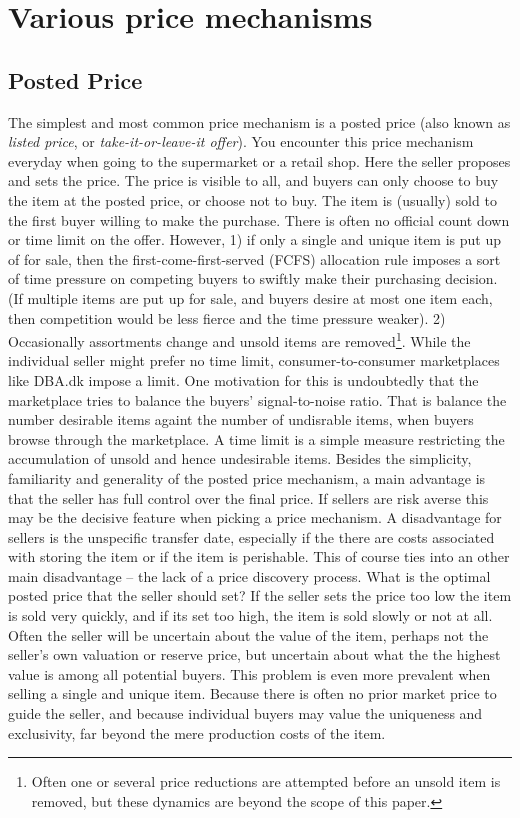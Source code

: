 \documentclass[a4paper,12pt]{article}
\begin{document}
	\section{Various price mechanisms}

	\subsection{Posted Price}
	The simplest and most common price mechanism is a posted price (also known as {\it listed price}, or {\it take-it-or-leave-it offer}). You encounter this price mechanism everyday when going to the supermarket or a retail shop. Here the seller proposes and sets the price. The price is visible to all, and buyers can only choose to buy the item at the posted price, or choose not to buy. The item is (usually) sold to the first buyer willing to make the purchase. There is often no official count down or time limit on the offer. However, 1) if only a single and unique item is put up of for sale, then the first-come-first-served (FCFS) allocation rule imposes a sort of time pressure on competing buyers to swiftly make their purchasing decision. (If multiple items are put up for sale, and buyers desire at most one item each, then competition would be less fierce and the time pressure weaker). 2) Occasionally assortments change and unsold items are removed\footnote{\label{footnote:price_reduction}Often one or several price reductions are attempted before an unsold item is removed, but these dynamics are beyond the scope of this paper.}. While the individual seller might prefer no time limit, consumer-to-consumer marketplaces like DBA.dk impose a limit. One motivation for this is undoubtedly that the marketplace tries to balance the buyers' signal-to-noise ratio. That is balance the number desirable items againt the number of undisrable items, when buyers browse through the marketplace. A time limit is a simple measure restricting the accumulation of unsold and hence undesirable items. Besides the simplicity, familiarity and generality of the posted price mechanism, a main advantage is that the seller has full control over the final price. If sellers are risk averse this may be the decisive feature when picking a price mechanism. A disadvantage for sellers is the unspecific transfer date, especially if the there are costs associated with storing the item or if the item is perishable. This of course ties into an other main disadvantage -- the lack of a price discovery process. What is the optimal posted price that the seller should set? If the seller sets the price too low the item is sold very quickly, and if its set too high, the item is sold slowly or not at all. Often the seller will be uncertain about the value of the item, perhaps not the seller's own valuation or reserve price, but uncertain about what the the highest value is among all potential buyers. This problem is even more prevalent when selling a single and unique item. Because there is often no prior market price to guide the seller, and because individual buyers may value the uniqueness and exclusivity, far beyond the mere production costs of the item.
\end{document}
